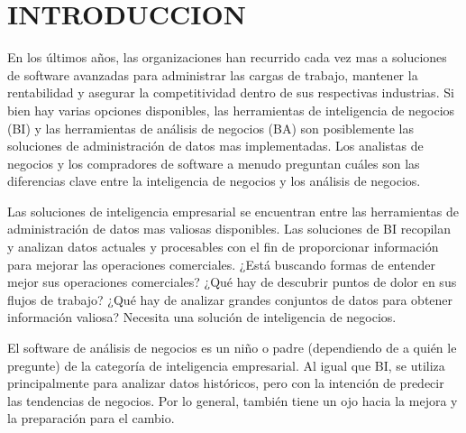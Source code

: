 \section{INTRODUCCION} 

En los \'ultimos años, las organizaciones han recurrido cada vez mas a soluciones de software avanzadas para administrar las cargas de trabajo, mantener la rentabilidad y asegurar la competitividad dentro de sus respectivas industrias. Si bien hay varias opciones disponibles, las herramientas de inteligencia de negocios (BI) y las herramientas de an\'alisis de negocios (BA) son posiblemente las soluciones de administraci\'on de datos mas implementadas. Los analistas de negocios y los compradores de software a menudo preguntan cuáles son las diferencias clave entre la inteligencia de negocios y los análisis de negocios.

Las soluciones de inteligencia empresarial se encuentran entre las herramientas de administraci\'on de datos mas valiosas disponibles. Las soluciones de BI recopilan y analizan datos actuales y procesables con el fin de proporcionar información para mejorar las operaciones comerciales. ¿Est\'a buscando formas de entender mejor sus operaciones comerciales? ¿Qu\'e hay de descubrir puntos de dolor en sus flujos de trabajo? ¿Qu\'e hay de analizar grandes conjuntos de datos para obtener información valiosa? Necesita una solución de inteligencia de negocios.

El software de an\'alisis de negocios es un niño o padre (dependiendo de a qui\'en le pregunte) de la categor\'ia de inteligencia empresarial. Al igual que BI, se utiliza principalmente para analizar datos hist\'oricos, pero con la intención de predecir las tendencias de negocios. Por lo general, también tiene un ojo hacia la mejora y la preparación para el cambio.